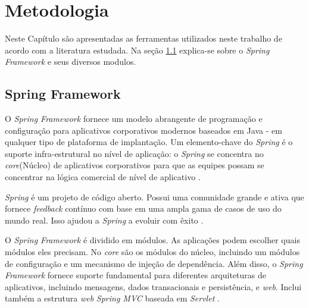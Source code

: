 
\chapter{Metodologia} \label{cap:metodologia}

Neste Capítulo são apresentadas as ferramentas utilizados neste trabalho de acordo com a literatura estudada. Na seção \ref{sec:SpringFramework} explica-se sobre o \textit{Spring Framework} e seus diversos modulos. 

\section{Spring Framework}\label{sec:SpringFramework}

O \textit{Spring Framework} fornece um modelo abrangente de programação e configuração para aplicativos corporativos modernos baseados em Java - em qualquer tipo de plataforma de implantação. Um elemento-chave do \textit{Spring} é o suporte infra-estrutural no nível de aplicação: o \textit{Spring} se concentra no \textit{core}(Núcleo) de aplicativos corporativos para que as equipes possam se concentrar na lógica comercial de nível de aplicativo \cite{SpringFramework:2017}.

\textit{Spring} é um projeto de código aberto. Possui uma comunidade grande e ativa que fornece \textit{feedback} contínuo com base em uma ampla gama de casos de uso do mundo real. Isso ajudou a \textit{Spring} a evoluir com êxito \cite{SpringFramework:2017}.

O \textit{Spring Framework} é dividido em módulos. As aplicações podem escolher quais módulos eles precisam. No \textit{core} são os módulos do núcleo, incluindo um módulos de configuração e um mecanismo de injeção de dependência. Além disso, o \textit{Spring Framework} fornece suporte fundamental para diferentes arquiteturas de aplicativos, incluindo mensagens, dados transacionais e persistência, e \textit{web}. Inclui também a estrutura \textit{web} \textit{Spring MVC} baseada em \textit{Servlet} \cite{SpringFramework:2017}.

